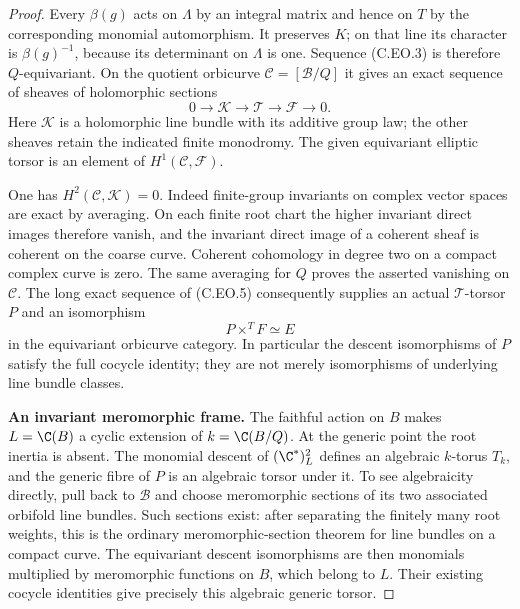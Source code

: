 \begin{proof}
Every $\beta(g)$ acts on $\Lambda$ by an integral
matrix and hence on $T$ by the corresponding
monomial automorphism. It preserves $K$; on
that line its character is $\beta(g)^{-1}$,
because its determinant on $\Lambda$ is one.
Sequence (C.EO.3) is therefore $Q$-equivariant.
On the quotient orbicurve $\mathcal C=[\mathcal B/Q]$
it gives an exact sequence of sheaves of
holomorphic sections
\[
 0\longrightarrow\mathcal K\longrightarrow
 \mathcal T\longrightarrow\mathcal F\longrightarrow0.
                                                               \tag{C.EO.5}
\]
Here $\mathcal K$ is a holomorphic line bundle
with its additive group law; the other sheaves
retain the indicated finite monodromy. The given
equivariant elliptic torsor is an element of
$H^1(\mathcal C,\mathcal F)$.

One has $H^2(\mathcal C,\mathcal K)=0$.
Indeed finite-group invariants on complex vector
spaces are exact by averaging. On each finite
root chart the higher invariant direct images
therefore vanish, and the invariant direct image
of a coherent sheaf is coherent on the coarse
curve. Coherent cohomology in degree two on a
compact complex curve is zero. The same averaging
for $Q$ proves the asserted vanishing on
$\mathcal C$. The long exact sequence of
(C.EO.5) consequently supplies an actual
$\mathcal T$-torsor $P$ and an isomorphism
\[
                  P\mathbin{\times^{T}}F
                           \simeq E                 \tag{C.EO.6}
\]
in the equivariant orbicurve category. In
particular the descent isomorphisms of $P$
satisfy the full cocycle identity; they are
not merely isomorphisms of underlying line
bundle classes.

\par\medskip\noindent\textbf{An invariant meromorphic frame.}
The faithful action on $B$ makes
$L=\C(B)$ a cyclic extension of
$k=\C(B/Q)$. At the generic point the root
inertia is absent. The monomial descent of
$(\C^*)^2_L$ defines an algebraic $k$-torus
$T_k$, and the generic fibre of $P$ is an
algebraic torsor under it. To see algebraicity
directly, pull back to $\mathcal B$ and choose
meromorphic sections of its two associated
orbifold line bundles. Such sections exist:
after separating the finitely many root weights,
this is the ordinary meromorphic-section theorem
for line bundles on a compact curve. The
equivariant descent isomorphisms are then
monomials multiplied by meromorphic functions
on $B$, which belong to $L$. Their existing
cocycle identities give precisely this algebraic
generic torsor.


\end{proof}
